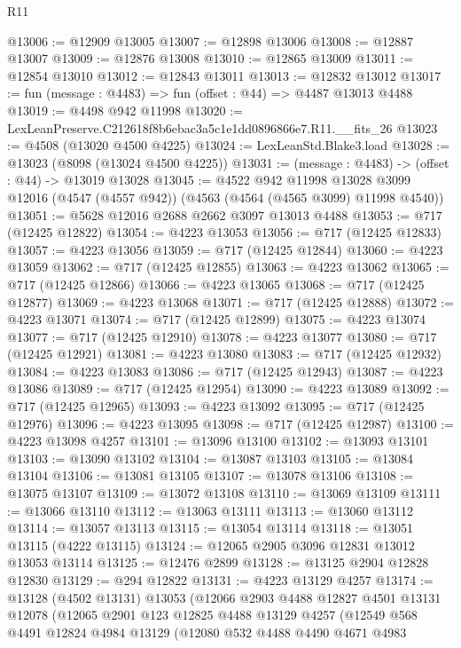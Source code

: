 \begin{lexlean}{R11}
\begin{coremodule}
@13006 := @12909 @13005
@13007 := @12898 @13006
@13008 := @12887 @13007
@13009 := @12876 @13008
@13010 := @12865 @13009
@13011 := @12854 @13010
@13012 := @12843 @13011
@13013 := @12832 @13012
@13017 := fun (message : @4483) => fun (offset : @44) => @4487 @13013 @4488
@13019 := @4498 @942 @11998
@13020 := LexLeanPreserve.C212618f8b6ebac3a5c1e1dd0896866e7.R11.__fits_26
@13023 := @4508 (@13020 @4500 @4225)
@13024 := LexLeanStd.Blake3.load
@13028 := @13023 (@8098 (@13024 @4500 @4225))
@13031 := (message : @4483) -> (offset : @44) -> @13019 @13028
@13045 := @4522
    @942
    @11998
    @13028
    @3099
    @12016
    (@4547 (@4557 @942))
    (@4563 (@4564 (@4565 @3099) @11998 @4540))
@13051 := @5628 @12016 @2688 @2662 @3097 @13013 @4488
@13053 := @717 (@12425 @12822)
@13054 := @4223 @13053
@13056 := @717 (@12425 @12833)
@13057 := @4223 @13056
@13059 := @717 (@12425 @12844)
@13060 := @4223 @13059
@13062 := @717 (@12425 @12855)
@13063 := @4223 @13062
@13065 := @717 (@12425 @12866)
@13066 := @4223 @13065
@13068 := @717 (@12425 @12877)
@13069 := @4223 @13068
@13071 := @717 (@12425 @12888)
@13072 := @4223 @13071
@13074 := @717 (@12425 @12899)
@13075 := @4223 @13074
@13077 := @717 (@12425 @12910)
@13078 := @4223 @13077
@13080 := @717 (@12425 @12921)
@13081 := @4223 @13080
@13083 := @717 (@12425 @12932)
@13084 := @4223 @13083
@13086 := @717 (@12425 @12943)
@13087 := @4223 @13086
@13089 := @717 (@12425 @12954)
@13090 := @4223 @13089
@13092 := @717 (@12425 @12965)
@13093 := @4223 @13092
@13095 := @717 (@12425 @12976)
@13096 := @4223 @13095
@13098 := @717 (@12425 @12987)
@13100 := @4223 @13098 @4257
@13101 := @13096 @13100
@13102 := @13093 @13101
@13103 := @13090 @13102
@13104 := @13087 @13103
@13105 := @13084 @13104
@13106 := @13081 @13105
@13107 := @13078 @13106
@13108 := @13075 @13107
@13109 := @13072 @13108
@13110 := @13069 @13109
@13111 := @13066 @13110
@13112 := @13063 @13111
@13113 := @13060 @13112
@13114 := @13057 @13113
@13115 := @13054 @13114
@13118 := @13051 @13115 (@4222 @13115)
@13124 := @12065 @2905 @3096 @12831 @13012 @13053 @13114
@13125 := @12476 @2899
@13128 := @13125 @2904 @12828 @12830
@13129 := @294 @12822
@13131 := @4223 @13129 @4257
@13174 := @13128
    (@4502 @13131)
    @13053
    (@12066
      @2903
      @4488
      @12827
      @4501
      @13131
      @12078
      (@12065
        @2901
        @123
        @12825
        @4488
        @13129
        @4257
        (@12549
          @568
          @4491
          @12824
          @4984
          @13129
          (@12080
            @532
            @4488
            @4490
            @4671
            @4983

\end{coremodule}
\end{lexlean}
